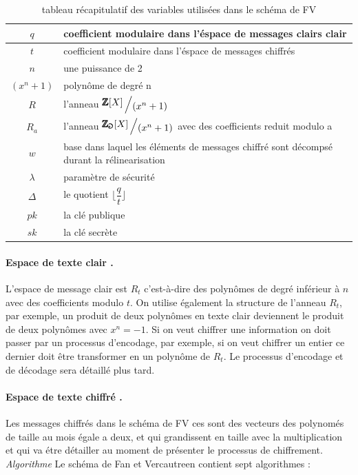 \documentclass[a4paper,12pt]{article}
\begin{document}
\begin{table}[h!]
  \centering
  \caption{tableau récapitulatif des variables utilisées dans le schéma de FV }
  \label{tab:recapitulatif_des_variables}
  \begin{tabular}{|c|l|}
    \hline
    $q$ &coefficient modulaire dans l'éspace de messages clairs clair \\
    \hline
    $t$ & coefficient modulaire dans l'éspace de messages chiffrés\\
    \hline
    $n$ & une puissance de 2\\
    \hline
    $(x^{n}+1)$ & polynôme de degré n\\
    \hline
    $R$ & l'anneau $\bigslant{\pmb{\mathbb{Z}}[X]}{(x^{n}+1)}$\\
    \hline
    $R_a$ & l'anneau $\bigslant{\pmb{\mathbb{Z_a}}[X]}{(x^{n}+1)}$ avec des coefficients reduit modulo a\\
    \hline
    $w$ & base dans laquel les éléments de messages chiffré sont décompsé durant la rélinearisation\\
    \hline
    $\lambda$ & paramètre de sécurité\\
    \hline
    $\Delta$ & le quotient $\lfloor\dfrac{q}{t}\rfloor$\\
    \hline
    $pk$ & la clé publique\\
    \hline
    $sk$ & la clé secrète\\
    \hline
    \end{tabular}
  \end{table}


\paragraph{ Espace de texte clair .}

L'espace de message clair est $R_t$ c'est-à-dire des polynômes de degré inférieur à $n$ avec des coefficients modulo $t$. On utilise également la structure de l'anneau $R_t$, par exemple, un produit de deux polynômes en texte clair deviennent le produit de deux polynômes avec $x^n = -1$.\newline
Si on veut chiffrer une information on doit passer par un processus d'encodage, par exemple, si on veut chiffrer un entier ce dernier doit être transformer en un polynôme de $R_t$. Le processus d'encodage et de décodage sera détaillé plus tard.\newline 
\paragraph{ Espace de texte chiffré .}
Les messages chiffrés dans le schéma de FV ces sont des vecteurs  des polynomés de taille au mois égale a deux, et qui grandissent en taille avec la multiplication et qui va étre détailler au moment de présenter le processus de chiffrement. 
\textit{Algorithme}
Le schéma de Fan et Vercautreen contient sept algorithmes : \newline
\end{document}
